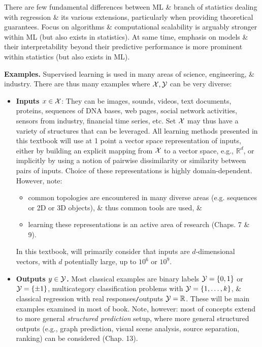 \documentclass{article}
\begin{document}
\begin{enumerate}
\begin{itemize}
\begin{itemize}
			There are few fundamental differences between ML \& branch of statistics dealing with regression \& its various extensions, particularly when providing theoretical guarantees. Focus on algorithms \& computational scalability is arguably stronger within ML (but also exists in statistics). At same time, emphasis on models \& their interpretability beyond their predictive performance is more prominent within statistics (but also exists in ML).
			
			{\bf Examples.} Supervised learning is used in many areas of science, engineering, \& industry. There are thus many examples where ${\cal X},{\cal Y}$ can be very diverse:
			\begin{itemize}
				\item {\bf Inputs $x\in{\cal X}$}: They can be images, sounds, videos, text documents, proteins, sequences of DNA bases, web pages, social network activities, sensors from industry, financial time series, etc. Set ${\cal X}$ may thus have a variety of structures that can be leveraged. All learning methods presented in this textbook will use at 1 point a vector space representation of inputs, either by building an explicit mapping from ${\cal X}$ to a vector space, e.g., $\mathbb{R}^d$, or implicitly by using a notion of pairwise dissimilarity or similarity between pairs of inputs. Choice of these representations is highly domain-dependent. However, note:
				\begin{itemize}
					\item common topologies are encountered in many diverse areas (e.g. sequences or 2D or 3D objects), \& thus common tools are used, \&
					\item learning these representations is an active area of research (Chaps. 7 \& 9).
				\end{itemize}
				In this textbook, will primarily consider that inputs are $d$-dimensional vectors, with $d$ potentially large, up to $10^6$ or $10^9$.
				\item {\bf Outputs $y\in{\cal Y}$.} Most classical examples are binary labels ${\cal Y} = \{0,1\}$ or ${\cal Y} = \{\pm1\}$, multicategory classification problems with ${\cal Y} = \{1,\ldots,k\}$, \& classical regression with real responses{\tt/}outputs ${\cal Y} = \mathbb{R}$. These will be main examples examined in most of book. Note, however: most of concepts extend to more general \emph{structured prediction} setup, where more general structured outputs (e.g., graph prediction, visual scene analysis, source separation, ranking) can be considered (Chap. 13).

\end{itemize}
\end{itemize}
\end{itemize}
\end{enumerate}
\end{document}
